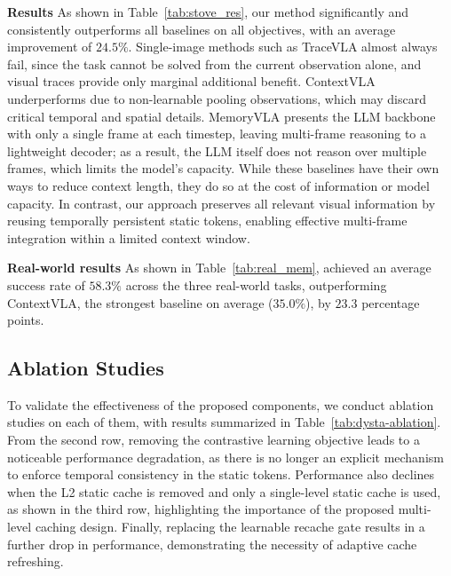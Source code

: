\noindent\textbf{Results} 
As shown in Table~\ref{tab:stove_res}, our method significantly and consistently outperforms all baselines on all objectives, with an average improvement of $24.5\%$.
Single-image methods such as TraceVLA almost always fail, since the task cannot be solved from the current observation alone, and visual traces provide only marginal additional benefit. 
ContextVLA underperforms due to non-learnable pooling observations, which may discard critical temporal and spatial details.
MemoryVLA presents the LLM backbone with only a single frame at each timestep, leaving multi-frame reasoning to a lightweight decoder; as a result, the LLM itself does not reason over multiple frames, which limits the model's capacity.
While these baselines have their own ways to reduce context length, they do so at the cost of information or model capacity. In contrast, our approach preserves all relevant visual information by reusing temporally persistent static tokens, enabling effective multi-frame integration within a limited context window.



\noindent\textbf{Real-world results}
As shown in Table~\ref{tab:real_mem}, \dysta{} achieved an average success rate of $58.3\%$ across the three real-world tasks, outperforming ContextVLA, the strongest baseline on average ($35.0\%$), by $23.3$ percentage points.

\subsection{Ablation Studies}

To validate the effectiveness of the proposed components, we conduct ablation studies on each of them, with results summarized in Table~\ref{tab:dysta-ablation}. From the second row, removing the contrastive learning objective leads to a noticeable performance degradation, as there is no longer an explicit mechanism to enforce temporal consistency in the static tokens. Performance also declines when the L2 static cache is removed and only a single-level static cache is used, as shown in the third row, highlighting the importance of the proposed multi-level caching design. Finally, replacing the learnable recache gate results in a further drop in performance, demonstrating the necessity of adaptive cache refreshing.

